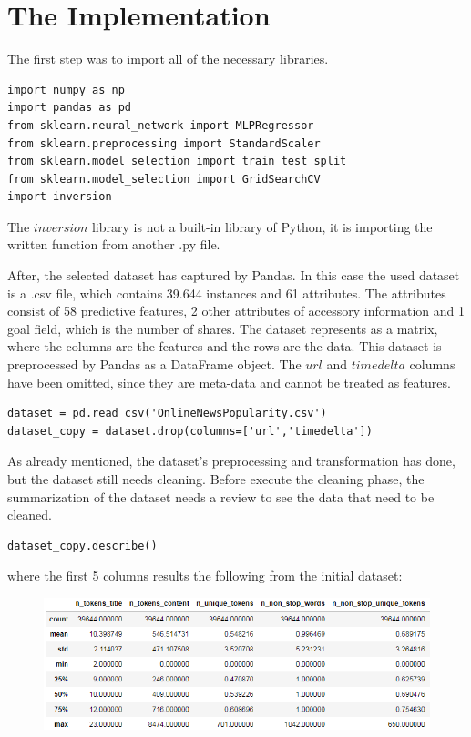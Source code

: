 \section{The Implementation}

The first step was to import all of the necessary libraries.
\begin{lstlisting}
import numpy as np
import pandas as pd
from sklearn.neural_network import MLPRegressor
from sklearn.preprocessing import StandardScaler
from sklearn.model_selection import train_test_split
from sklearn.model_selection import GridSearchCV
import inversion
\end{lstlisting}
The $inversion$ library is not a built-in library of Python, it is importing the written function from another .py file.\smallskip

After, the selected dataset has captured by Pandas. In this case the used dataset is a .csv file, which contains 39.644 instances and 61 attributes. The attributes consist of 58 predictive features, 2 other attributes of accessory information and 1 goal field, which is the number of shares. The dataset represents as a matrix, where the columns are the features and the rows are the data. This dataset is preprocessed by Pandas as a DataFrame object. The $url$ and $timedelta$ columns have been omitted, since they are meta-data and cannot be treated as features. 
\begin{lstlisting}
dataset = pd.read_csv('OnlineNewsPopularity.csv')
dataset_copy = dataset.drop(columns=['url','timedelta'])
\end{lstlisting}

\medskip As already mentioned, the dataset's preprocessing and transformation has done, but the dataset still needs cleaning. Before execute the cleaning phase, the summarization of the dataset needs a review to see the data that need to be cleaned.
\begin{lstlisting}
dataset_copy.describe()
\end{lstlisting}
where the first 5 columns results the following from the initial dataset:
\begin{figure}[h]
	\centering
	\includegraphics[height=0.34\linewidth]{./figures/describe1}
	\label{fig:describe1}
\end{figure}

